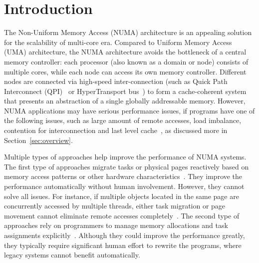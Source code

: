 
\section{Introduction}
\label{sec:intro}

The Non-Uniform Memory Access (NUMA) architecture is an appealing solution for the scalability of multi-core era. Compared to Uniform Memory Access (UMA) architecture, the NUMA architecture avoids the bottleneck of a central memory controller: each processor (also known as a domain or node) consists of multiple cores, while each node can access its own memory controller. Different nodes are connected via high-speed inter-connection (such as Quick Path Interconnect (QPI)~\cite{intelqpi} or HyperTransport bus~\cite{hypertransport}) to form a cache-coherent system that presents an abstraction of a single globally addressable memory. 
However, NUMA applications may have serious performance issues, if programs have one of the following issues, such as large amount of remote accesses, load imbalance, contention for interconnection and last level cache~\cite{Blagodurov:2011:CNC:2002181.2002182, Dashti:2013:TMH:2451116.2451157}, as discussed more in Section~\ref{sec:overview}. 

Multiple types of approaches help improve the performance of NUMA systems. The first type of approaches migrate tasks or physical pages reactively based on memory access patterns or other hardware characteristics~\cite{Blagodurov:2011:CNC:2002181.2002182, AutoNUMA, Dashti:2013:TMH:2451116.2451157, Lepers:2015:TMP:2813767.2813788}. They improve the performance automatically without human involvement. However, they cannot solve all issues. For instance, if multiple objects located in the same page are concurrently accessed by multiple threads, either task migration or page movement cannot eliminate remote accesses completely~\cite{Gaud:2014:LPM:2643634.2643659}. The second type of approaches rely on programmers to manage memory allocations and task assignments explicitly~\cite{Zhang:2015:NGA:2688500.2688507, Kaestle:2015:SSA:2813767.2813787, Lin:2016:MTP:2872362.2872401, Majo:2017:LPC:3057718.3040222}. Although they could improve the performance greatly, they typically require significant human effort to rewrite the programs, where legacy systems cannot benefit automatically. 



